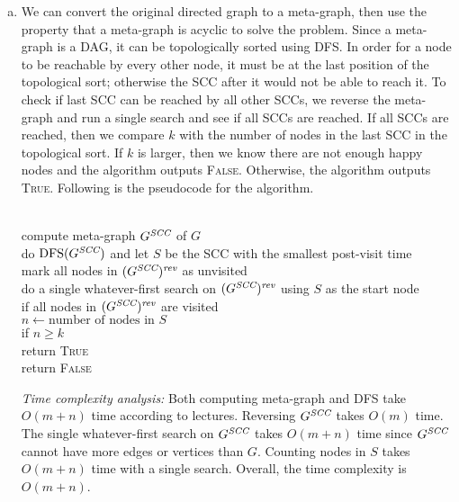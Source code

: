 \documentclass[11pt]{article}
\begin{document}
\begin{solution}
\begin{enumerate}[(a)]
\item
We can convert the original directed graph to a meta-graph, then use the property that a meta-graph is acyclic to solve the problem. Since a meta-graph is a DAG, it can be topologically sorted using DFS. In order for a node to be reachable by every other node, it must be at the last position of the topological sort; otherwise the SCC after it would not be able to reach it. To check if last SCC can be reached by all other SCCs, we reverse the meta-graph and run a single search and see if all SCCs are reached. If all SCCs are reached, then we compare $k$ with the number of nodes in the last SCC in the topological sort. If $k$ is larger, then we know there are not enough happy nodes and the algorithm outputs \textsc{False}. Otherwise, the algorithm outputs \textsc{True}. Following is the pseudocode for the algorithm.
\begin{algo}
	\textsc{}\+
\\	compute meta-graph $G^{\emph{SCC}}$ of $G$
\\	do $\text{DFS}(G^{\emph{SCC}})$ and let $S$ be the SCC with the smallest post-visit time
\\	mark all nodes in $(G^{\emph{SCC}})^{\emph{rev}}$ as unvisited
\\	do a single whatever-first search on $(G^{\emph{SCC}})^{\emph{rev}}$ using $S$ as the start node
\\	if all nodes in $(G^{\emph{SCC}})^{\emph{rev}}$ are visited\+
\\	$n\gets \text{number of nodes in $S$}$
\\	if $n\ge k$\+
\\	return \textsc{True}\-\-
\\	return \textsc{False}\-
\end{algo}
\emph{Time complexity analysis: }Both computing meta-graph and DFS take $O(m+n)$ time according to lectures. Reversing $G^{\emph{SCC}}$ takes $O(m)$ time. The single whatever-first search on $G^{\emph{SCC}}$ takes $O(m+n)$ time since $G^{\emph{SCC}}$ cannot have more edges or vertices than $G$. Counting nodes in $S$ takes $O(m+n)$ time with a single search. Overall, the time complexity is $O(m+n)$.


\end{enumerate}
\end{solution}
\end{document}
